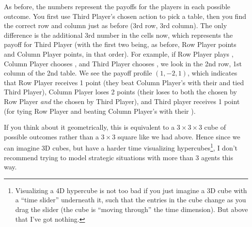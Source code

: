 As before, the numbers represent the payoffs for the players in each possible outcome. You first use Third Player's chosen action to pick a table, then you find the correct row and column just as before (3rd row, 3rd column). The only difference is the additional 3rd number in the cells now, which represents the payoff for Third Player (with the first two being, as before, Row Player points and Column Player points, in that order). For example, if Row Player plays , Column Player chooses , and Third Player chooses , we look in the 2nd row, 1st column of the 2nd table. We see the payoff profile $(1,-2,1)$, which indicates that Row Player receives 1 point (they beat Column Player's  with their  and tied Third Player), Column Player loses 2 points (their  loses to both the  chosen by Row Player \textit{and} the  chosen by Third Player), and Third player receives 1 point (for tying Row Player and beating Column Player's  with their ).

If you think about it geometrically, this is equivalent to a $3 \times 3 \times 3$ cube of possible outcomes rather than a $3 \times 3$ square like we had above. Hence since we can imagine 3D cubes, but have a harder time visualizing hypercubes\footnote{Visualizing a 4D hypercube is not too bad if you just imagine a 3D cube with a ``time slider'' underneath it, such that the entries in the cube change as you drag the slider (the cube is ``moving through'' the time dimension). But above that I've got nothing.}, I don't recommend trying to model strategic situations with more than 3 agents this way.

